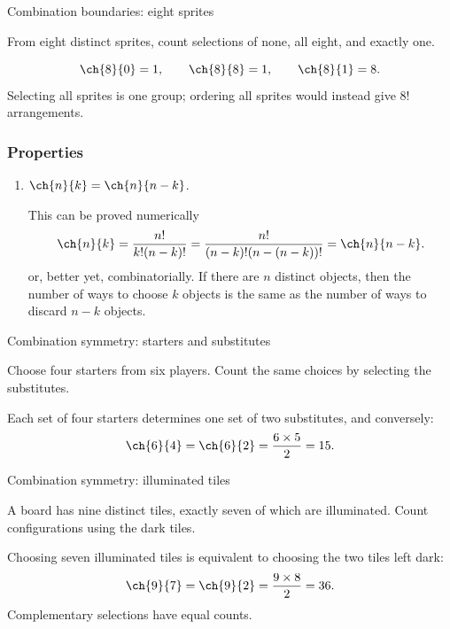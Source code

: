 \begin{frame}[t]{Combination boundaries: eight sprites}
\small
\begin{ex}
From eight distinct sprites, count selections of none, all eight, and exactly one.
\end{ex}
\begin{sol}
\[\ch{8}{0}=1,\qquad\ch{8}{8}=1,\qquad\ch{8}{1}=8.\] Selecting all sprites is one group; ordering all sprites would instead give $8!$ arrangements.
\end{sol}
\end{frame}




\begin{frame}
\frametitle{Properties}
\begin{prop}{}{}
\begin{enumerate}
\item $\ch{n}{k} = \ch{n}{n-k}$. \begin{slide}This can be proved numerically 
\[ \ch{n}{k} = \frac{n!}{k! (n-k)!} = \frac{n!}{(n-k)! (n- (n-k))!} = \ch{n}{n-k}.\]
or, better yet, combinatorially. If there are $n$ distinct objects, then the number of ways to choose $k$ objects is the same as the number of ways to discard $n-k$ objects.\end{slide}
\end{enumerate}
\end{prop}
\end{frame}
\begin{frame}[t]{Combination symmetry: starters and substitutes}
\small
\begin{ex}
Choose four starters from six players. Count the same choices by selecting the substitutes.
\end{ex}
\begin{sol}
Each set of four starters determines one set of two substitutes, and conversely:\[\ch{6}{4}=\ch{6}{2}=\frac{6\times5}{2}=15.\]
\end{sol}
\end{frame}

\begin{frame}[t]{Combination symmetry: illuminated tiles}
\small
\begin{ex}
A board has nine distinct tiles, exactly seven of which are illuminated. Count configurations using the dark tiles.
\end{ex}
\begin{sol}
Choosing seven illuminated tiles is equivalent to choosing the two tiles left dark:\[\ch{9}{7}=\ch{9}{2}=\frac{9\times8}{2}=36.\] Complementary selections have equal counts.
\end{sol}
\end{frame}


